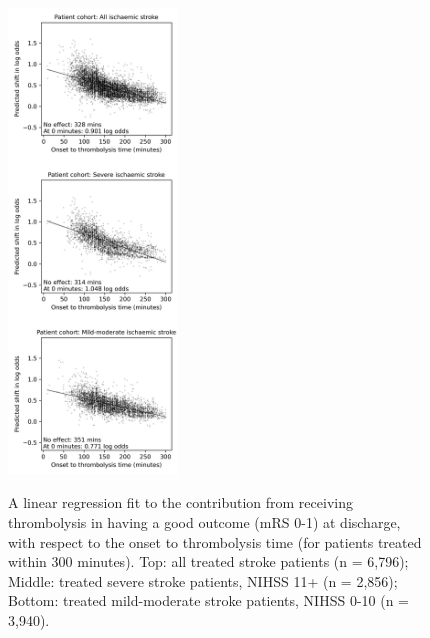 \begin{figure}[ht]
    \centering
    \includegraphics[width=0.40\textwidth]{./images/p3_regression_v1}\\
    \caption{A linear regression fit to the contribution from receiving thrombolysis in having a good outcome (mRS 0-1) at discharge, with respect to the onset to thrombolysis time (for patients treated within 300 minutes). Top: all treated stroke patients (n = 6,796); Middle: treated severe stroke patients, NIHSS 11+ (n = 2,856); Bottom: treated mild-moderate stroke patients, NIHSS 0-10 (n = 3,940).}
    \label{fig:linear_regression_plots}
\end{figure}

